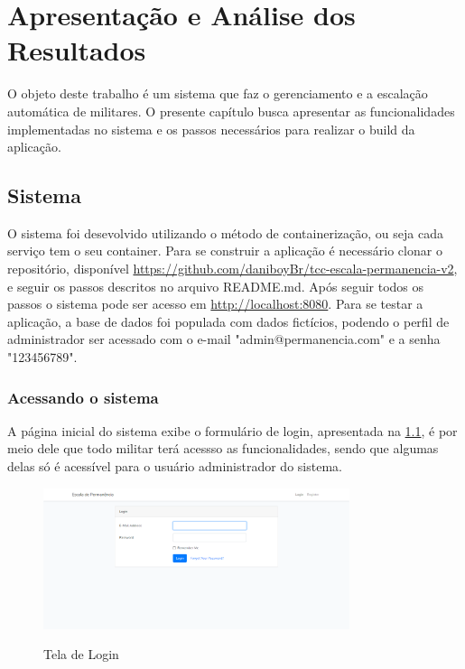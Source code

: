 \chapter{Apresentação e Análise dos Resultados}
O objeto deste trabalho é um sistema que faz o gerenciamento e a escalação automática de militares. O presente capítulo busca apresentar as funcionalidades implementadas no sistema e os passos necessários para realizar o build da aplicação.

\section{Sistema}

O sistema foi desevolvido utilizando o método de containerização, ou seja cada serviço tem o seu container. Para se construir a aplicação é necessário clonar o repositório, disponível \url{https://github.com/daniboyBr/tcc-escala-permanencia-v2}, e seguir os passos descritos no arquivo README.md. Após seguir todos os passos o sistema pode ser acesso em \url{http://localhost:8080}. Para se testar a aplicação, a base de dados foi populada com dados fictícios, podendo o perfil de administrador ser acessado com o e-mail "admin@permanencia.com" e a senha "123456789".

\subsection{Acessando o sistema}

A página inicial do sistema exibe o formulário de login, apresentada na \ref{fig:login}, é por meio dele que todo militar terá acessso as funcionalidades, sendo que algumas delas só é acessível para o usuário administrador do sistema.

\begin{figure}[!htb]
    \centering
    \caption{Tela de Login}
    \includegraphics[width=0.8\textwidth]{images/1 - Pagina Inicial - Tela de Login.png}
    \label{fig:login}
\end{figure}

